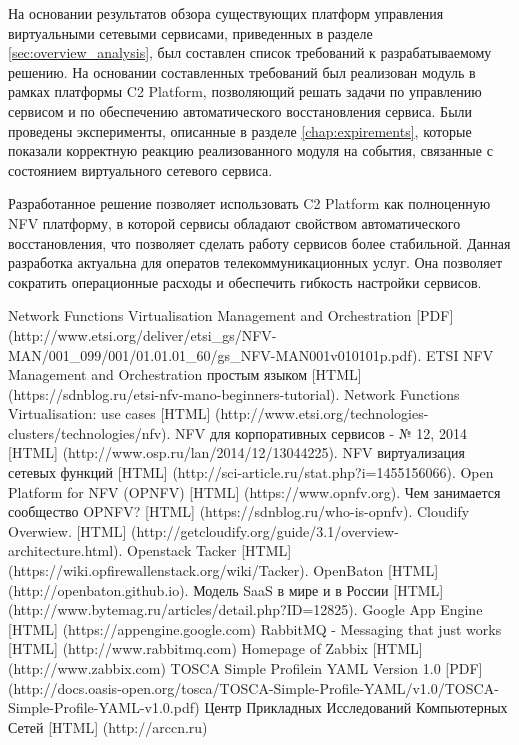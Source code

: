 \documentclass[oneside,final,14pt,a4paper]{extreport}
\begin{document}
На основании результатов обзора существующих платформ управления виртуальными сетевыми сервисами, приведенных в разделе \ref{sec:overview_analysis}, был составлен список требований к разрабатываемому решению. На основании составленных требований был реализован модуль в рамках платформы C2 Platform, позволяющий решать задачи по управлению сервисом и по обеспечению автоматического восстановления сервиса. Были проведены эксперименты, описанные в разделе \ref{chap:expirements}, которые показали корректную реакцию реализованного модуля на события, связанные с состоянием виртуального сетевого сервиса.

Разработанное решение позволяет использовать C2 Platform как полноценную NFV платформу, в которой сервисы обладают свойством автоматического восстановления, что позволяет сделать работу сервисов более стабильной. Данная разработка актуальна для оператов телекоммуникационных услуг. Она позволяет сократить операционные расходы и обеспечить гибкость настройки сервисов.





\begin{thebibliography}{00}
 Network Functions Virtualisation Management and Orchestration [PDF] (http://www.etsi.org/deliver/etsi\_gs/NFV-MAN/001\_099/001/01.01.01\_60/gs\_NFV-MAN001v010101p.pdf).
 ETSI NFV Management and Orchestration простым языком [HTML] (https://sdnblog.ru/etsi-nfv-mano-beginners-tutorial).
 Network Functions Virtualisation: use cases [HTML] (http://www.etsi.org/technologies-clusters/technologies/nfv).
 NFV для корпоративных сервисов - № 12, 2014 [HTML] (http://www.osp.ru/lan/2014/12/13044225).
 NFV виртуализация сетевых функций [HTML] (http://sci-article.ru/stat.php?i=1455156066).
 Open Platform for NFV (OPNFV) [HTML] (https://www.opnfv.org).
 Чем занимается сообщество OPNFV? [HTML] (https://sdnblog.ru/who-is-opnfv).
 Cloudify Overwiew. [HTML] (http://getcloudify.org/guide/3.1/overview-architecture.html).
 Openstack Tacker [HTML] (https://wiki.opfirewallenstack.org/wiki/Tacker).
 OpenBaton [HTML] (http://openbaton.github.io).
 Модель SaaS в мире и в России [HTML] (http://www.bytemag.ru/articles/detail.php?ID=12825).
 Google App Engine [HTML] (https://appengine.google.com)
 RabbitMQ - Messaging that just works [HTML] (http://www.rabbitmq.com)
 Homepage of Zabbix [HTML] (http://www.zabbix.com)
 TOSCA Simple Profilein YAML Version 1.0 [PDF] (http://docs.oasis-open.org/tosca/TOSCA-Simple-Profile-YAML/v1.0/TOSCA-Simple-Profile-YAML-v1.0.pdf)
 Центр Прикладных Исследований Компьютерных Сетей [HTML] (http://arccn.ru)
\end{thebibliography}

\end{document}
